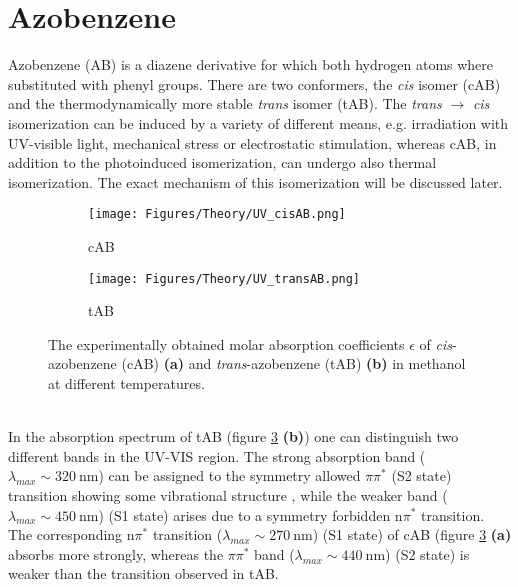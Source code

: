 \section{Azobenzene}
Azobenzene (AB) is a diazene derivative for which both hydrogen atoms where substituted with phenyl groups. \cite{AB_1} There are two conformers, the  \textit{cis} isomer (cAB) and the thermodynamically more stable \textit{trans} isomer (tAB). The \textit{trans} $\rightarrow$ \textit{cis} isomerization can be induced by a variety of different means, e.g. irradiation with UV-visible light\cite{AB_2}, mechanical stress\cite{AB_3} or electrostatic stimulation\cite{AB_4}, whereas cAB, in addition to the photoinduced isomerization, can undergo also thermal isomerization.\cite{AB_2} The exact mechanism of this isomerization will be discussed later.
%
\begin{figure}[h]
\centering
\begin{subfigure}{.5\textwidth}
  \centering
  \texttt{[image: Figures/Theory/UV\_cisAB.png]}
  \caption{cAB}
  \label{fig:UV_exp_cAB}
\end{subfigure}%
\medskip
\begin{subfigure}{.5\textwidth}
  \centering
  \texttt{[image: Figures/Theory/UV\_transAB.png]}
  \caption{tAB}
  \label{fig:UV_exp_tAB}
\end{subfigure}
\caption{The experimentally obtained molar absorption coefficients $\epsilon$ of \textit{cis}-azobenzene (cAB) \textbf{(a)} and \textit{trans}-azobenzene (tAB) \textbf{(b)} in methanol at different temperatures.\cite{AB_5}}
\label{fig:UV_exp_both_AB}
\end{figure} \\
%
%
In the absorption spectrum of tAB (figure \ref{fig:UV_exp_both_AB} \textbf{(b)}) one can distinguish two different bands in the UV-VIS region. 
The strong absorption band ($\lambda_{max} \sim \SI{320}{\nano\meter}$) can be assigned to the symmetry allowed $\pi\pi^{*}$ (S2 state) transition showing some vibrational structure \cite{AB_6}, while the weaker band ($\lambda_{max} \sim \SI{450}{\nano\meter}$) (S1 state) arises due to a symmetry forbidden n$\pi^{*}$ transition. 
The corresponding n$\pi^{*}$ transition ($\lambda_{max} \sim \SI{270}{\nano\meter}$) (S1 state) of cAB (figure \ref{fig:UV_exp_both_AB} \textbf{(a)} absorbs more strongly, whereas the $\pi\pi^{*}$ band ($\lambda_{max} \sim \SI{440}{\nano\meter}$) (S2 state) is weaker than the transition observed in tAB. \\

